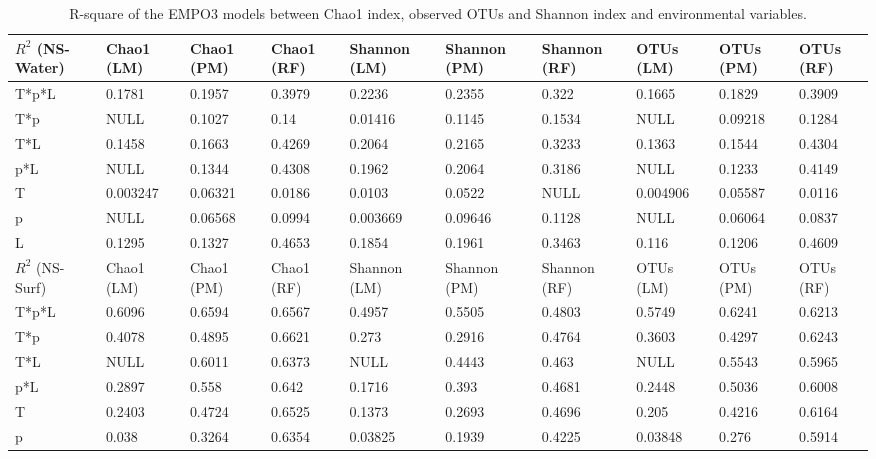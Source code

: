 \begin{table}[H]
    \caption{R-square of the EMPO3 models between Chao1 index, observed OTUs and Shannon index and environmental variables.}
    \centering
    \begin{tabular}{ |m{1cm}<{\centering}|m{1.3cm}<{\centering}|m{1.3cm}<{\centering}|m{1.3cm}<{\centering}|m{1.3cm}<{\centering}|m{1.3cm}<{\centering}|m{1.3cm}<{\centering}|m{1.3cm}<{\centering}|m{1.3cm}<{\centering}|m{1.3cm}<{\centering}|} 
    \hline
     $R^{2}$ (NS-Water) & Chao1 (LM) & Chao1 (PM) & Chao1 (RF) & Shannon (LM) & Shannon (PM) & Shannon (RF) & OTUs (LM) & OTUs (PM) & OTUs (RF) \\
     \hline
    T*p*L & 0.1781 & 0.1957 & 0.3979 & 0.2236 & 0.2355 & 0.322 & 0.1665 & 0.1829 & 0.3909 \\
    T*p & NULL & 0.1027 & 0.14 & 0.01416 & 0.1145 & 0.1534 & NULL & 0.09218 & 0.1284 \\
    T*L & 0.1458 & 0.1663 & 0.4269 & 0.2064 & 0.2165 & 0.3233 & 0.1363 & 0.1544 & 0.4304 \\
    p*L & NULL & 0.1344 & 0.4308 & 0.1962 & 0.2064 & 0.3186 & NULL & 0.1233 & 0.4149 \\
    T & 0.003247 & 0.06321 & 0.0186 & 0.0103 & 0.0522 & NULL & 0.004906 & 0.05587 & 0.0116 \\
    p & NULL & 0.06568 & 0.0994 & 0.003669 & 0.09646 & 0.1128 & NULL & 0.06064 & 0.0837 \\
    L & 0.1295 & 0.1327 & 0.4653 & 0.1854 & 0.1961 & 0.3463 & 0.116 & 0.1206 & 0.4609 \\
    \hline
    \hline
     $R^{2}$ (NS-Surf) & Chao1 (LM) & Chao1 (PM) & Chao1 (RF) & Shannon (LM) & Shannon (PM) & Shannon (RF) & OTUs (LM) & OTUs (PM) & OTUs (RF) \\
     \hline
    T*p*L & 0.6096 & 0.6594 & 0.6567 & 0.4957 & 0.5505 & 0.4803 & 0.5749 & 0.6241 & 0.6213 \\
    T*p & 0.4078 & 0.4895 & 0.6621 & 0.273 & 0.2916 & 0.4764 & 0.3603 & 0.4297 & 0.6243 \\
    T*L & NULL & 0.6011 & 0.6373 & NULL & 0.4443 & 0.463 & NULL & 0.5543 & 0.5965 \\
    p*L & 0.2897 & 0.558 & 0.642 & 0.1716 & 0.393 & 0.4681 & 0.2448 & 0.5036 & 0.6008 \\
    T & 0.2403 & 0.4724 & 0.6525 & 0.1373 & 0.2693 & 0.4696 & 0.205 & 0.4216 & 0.6164 \\
    p & 0.038 & 0.3264 & 0.6354 & 0.03825 & 0.1939 & 0.4225 & 0.03848 & 0.276 & 0.5914 \\

\end{tabular}
\end{table}
